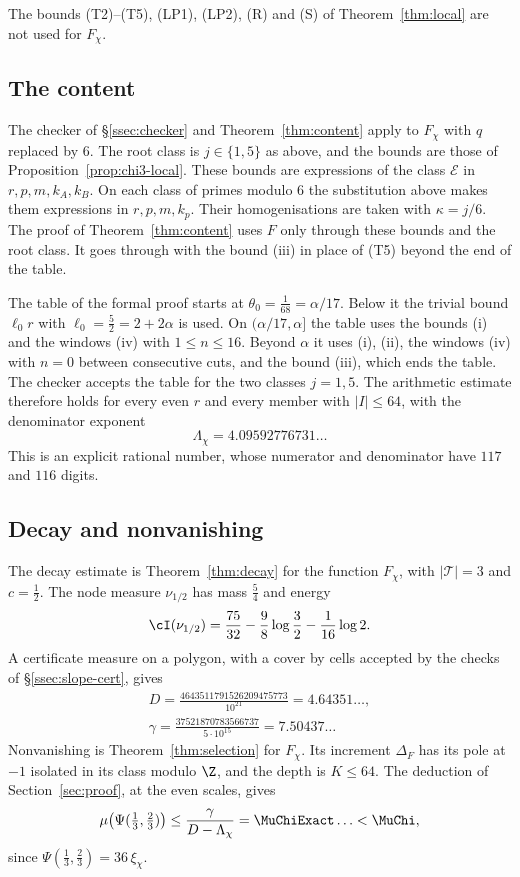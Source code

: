 The bounds (T2)--(T5), (LP1), (LP2), (R) and (S) of Theorem~\ref{thm:local} are not used for $F_\chi$.

\subsection{The content}
The checker of \S\ref{ssec:checker} and Theorem~\ref{thm:content} apply to $F_\chi$ with $q$ replaced by $6$. The root
class is $j\in\{1,5\}$ as above, and the bounds are those of Proposition~\ref{prop:chi3-local}. These bounds are
expressions of the class $\mathcal E$ in $r,p,m,k_A,k_B$. On each class of primes modulo $6$ the substitution above makes
them expressions in $r,p,m,k_p$. Their homogenisations are taken with $\kappa=j/6$. The proof of
Theorem~\ref{thm:content} uses $F$ only through these bounds and the root class. It goes through with the bound
(iii) in place of (T5) beyond the end of the table.

The table of the formal proof starts at $\theta_0=\frac1{68}=\alpha/17$. Below it the trivial bound $\ell_0r$ with
$\ell_0=\frac52=2+2\alpha$ is used. On $(\alpha/17,\alpha]$ the table uses the bounds (i) and the windows (iv) with
$1\le n\le16$. Beyond $\alpha$ it uses (i), (ii), the windows (iv) with $n=0$ between consecutive cuts, and the bound
(iii), which ends the table. The checker accepts the table for the two classes $j=1,5$. The arithmetic estimate therefore
holds for every even $r$ and every member with $|I|\le64$, with the denominator exponent
\[
 \Lambda_\chi=4.09592776731\ldots
\]
This is an explicit rational number, whose numerator and denominator have $117$ and $116$ digits.

\subsection{Decay and nonvanishing}
The decay estimate is Theorem~\ref{thm:decay} for the function $F_\chi$, with $|\mathcal T|=3$ and $c=\frac12$. The node
measure $\nu_{1/2}$ has mass $\frac54$ and energy
\[
 \cI(\nu_{1/2})=\frac{75}{32}-\frac98\log\frac32-\frac1{16}\log2 .
\]
A certificate measure on a polygon, with a cover by cells accepted by the checks of \S\ref{ssec:slope-cert}, gives
\[
\begin{gathered}
 D=\frac{4643511791526209475773}{10^{21}}=4.64351\ldots,\\ \gamma=\frac{37521870783566737}{5\cdot10^{15}}=7.50437\ldots
\end{gathered}
\]
Nonvanishing is Theorem~\ref{thm:selection} for $F_\chi$. Its increment $\Delta_F$ has its pole at $-1$ isolated in its
class modulo $\Z$, and the depth is $K\le64$. The deduction of Section~\ref{sec:proof}, at the even scales, gives
\[
 \mu\bigl(\Psi(\tfrac13,\tfrac23)\bigr)\le\frac\gamma{D-\Lambda_\chi}=\MuChiExact\ldots<\MuChi,
\]
since $\Psi(\frac13,\frac23)=36\,\xi_\chi$.
